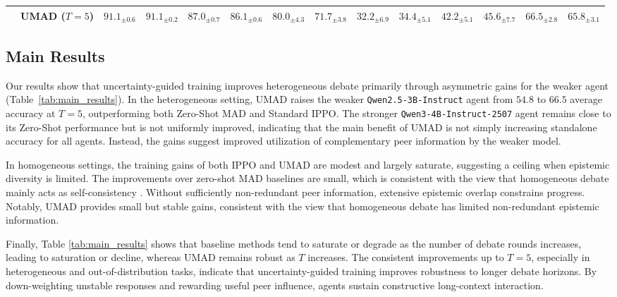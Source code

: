 \documentclass{article}
\newcommand{\bg}[2][0]{\cellcolor{MBlue!#1}#2}
\newcommand{\bged}[2][0]{\cellcolor{MPink!#1}#2}
\newcommand{\sd}[2]{{#1}_{\pm#2}}
\newcommand{\sdb}[2]{\mathbf{#1}_{\pm#2}}
\theoremstyle{plain}
\theoremstyle{definition}
\theoremstyle{remark}
\begin{document}
\begin{table}[t]
{\begin{tabular}{l|l|cc|cc|cc|cc|cc|cc}
& UMAD ($T=5$) & \bg[30]{$\sdb{91.1}{0.6}$} & \bg[15]{$\sdb{91.1}{0.2}$} & \bg[35]{$\sdb{87.0}{0.7}$} & \bg[15]{$\sdb{86.1}{0.6}$} & \bg[55]{$\sdb{80.0}{4.3}$} & \bged[15]{$\sd{71.7}{3.8}$} & \bg[15]{$\sdb{32.2}{6.9}$} & \bged[10]{$\sd{34.4}{5.1}$} & \bg[75]{$\sdb{42.2}{5.1}$} & \bg[20]{$\sdb{45.6}{7.7}$} & \bg[65]{$\sdb{66.5}{2.8}$} & \bg[5]{$\sd{65.8}{3.1}$}\\
\bottomrule
\end{tabular}
}
\end{table}





\subsection{Main Results}





Our results show that uncertainty-guided training improves heterogeneous debate primarily through asymmetric gains for the weaker agent (Table~\ref{tab:main_results}). In the heterogeneous setting, UMAD raises the weaker \texttt{Qwen2.5-3B-Instruct} agent from $54.8$ to $66.5$ average accuracy at $T=5$, outperforming both Zero-Shot MAD and Standard IPPO. The stronger \texttt{Qwen3-4B-Instruct-2507} agent remains close to its Zero-Shot performance but is not uniformly improved, indicating that the main benefit of UMAD is not simply increasing standalone accuracy for all agents. Instead, the gains suggest improved utilization of complementary peer information by the weaker model.


In homogeneous settings, the training gains of both IPPO and UMAD are modest and largely saturate, suggesting a ceiling when epistemic diversity is limited. The improvements over zero-shot MAD baselines are small, which is consistent with the view that homogeneous debate mainly acts as self-consistency \cite{choi2025debate}. Without sufficiently non-redundant peer information, extensive epistemic overlap constrains progress. Notably, UMAD provides small but stable gains, consistent with the view that homogeneous debate has limited non-redundant epistemic information. 

Finally, Table \ref{tab:main_results} shows that baseline methods tend to saturate or degrade as the number of debate rounds increases, leading to saturation or decline, whereas UMAD remains robust as $T$ increases. The consistent improvements up to $T=5$, especially in heterogeneous and out-of-distribution tasks, indicate that uncertainty-guided training improves robustness to longer debate horizons. By down-weighting unstable responses and rewarding useful peer influence, agents sustain constructive long-context interaction.
\end{document}

